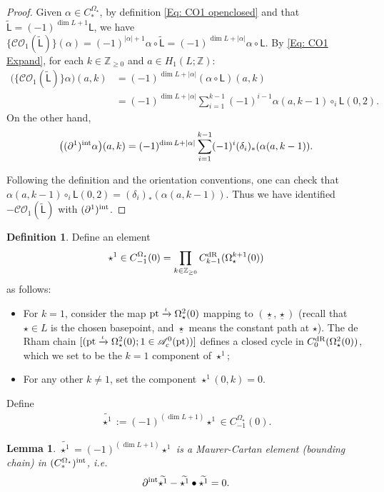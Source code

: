 \documentclass[10pt]{amsart}
\numberwithin{equation}{section}
\theoremstyle{plain}
\newtheorem{lemma}[theorem]{Lemma}
\theoremstyle{definition}
\newtheorem{definition}[theorem]{Definition}
\theoremstyle{remark}
\numberwithin{equation}{section}
\newcommand{\Z}{\mathbb{Z}}
\newcommand{\wt}[1]{\widetilde{#1}}
\newcommand{\dR}{\textup{dR}}
\newcommand{\pt}{\textup{pt}}
\newcommand{\CO}{\mathcal{CO}}
\newcommand{\CBa}{C_*^{\Omega_\star}}
\newcommand{\Cba}[1]{C_{#1}^{\Omega_\star}}
\newcommand{\LL}{\textsf{L}}
\begin{document}
{\begin{proof}
 Given $\alpha\in \CBa$, by definition \eqref{Eq: CO1 openclosed} and that $\wt{\LL} = (-1)^{\dim L + 1} \LL$,  we have $\big\{\CO_1(\wt{\LL})\big\}(\alpha) = (-1)^{|\alpha|+1}\alpha\circ \wt{\LL} = (-1)^{\dim L + |\alpha|} \alpha \circ \LL$. By \eqref{Eq: CO1 Expand}, for each $k\in \Z_{\geq 0}$ and $a\in H_1(L;\Z)$:
 \begin{align*}
 	\big(\big\{\CO_1(\wt{\LL})\big\}\alpha \big)(a,k) &= (-1)^{\dim L + |\alpha|}(\alpha\circ \LL)(a,k) \\&= (-1)^{\dim L + |\alpha|}\sum_{i=1}^{k-1} (-1)^{i-1}  \alpha (a,k-1)\circ_i \LL(0,2).
 \end{align*}
 On the other hand, 
 \begin{align*}
 	\big((\partial^1)^{\textup{int}}\alpha\big)(a,k)=(-1)^{\dim L +|\alpha|} \sum_{i=1}^{k-1} (-1)^{i}(\delta_i)_*(\alpha (a,k-1)).
 \end{align*}

Following the definition and the orientation conventions, one can check that $\alpha(a,k-1)\circ_i \LL(0,2) = (\delta_i)_*(\alpha(a,k-1)).$
Thus we have identified $-\CO_1(\wt{\LL})$ with $(\partial^1)^{\textup{int}}$.
\end{proof}

\begin{definition}
	Define an element \[ \star^1\in \Cba{-1}(0) = \prod_{k\in \Z_{\geq 0}} C^\dR_{k-1}(\Omega_\star^{k+1}(0))\] as follows: 
	\begin{itemize}
		\item For $k=1$, consider the map $\pt\xrightarrow{\iota} \Omega^2_\star(0)$ mapping to $(\underline{\star},\underline{\star})$ (recall that $\star \in L$ is the chosen basepoint, and $\underline{\star}$ means the constant path at $\star$). The de Rham chain $[(\pt\xrightarrow{\iota} \Omega^2_\star(0); 1\in \mathscr{A}^0_c(\pt))]$ defines a closed cycle in $C^\dR_{0}(\Omega^2_\star(0))$, which we set to be the $k=1$ component of $\star^1$;
		\item For any other $k\neq 1$, set the component $\star^1(0,k)=0$.
	\end{itemize}
	Define \begin{align}\label{Eq: BasedLoopMCApp} \wt{\star^1}:= (-1)^{(\dim L + 1)} \star^1 \in \Cba{-1}(0). \end{align}
\end{definition}

\begin{lemma}\label{Lm: OpenStrApp Step2}
	$\wt{\star^1}=(-1)^{(\dim L  +1)}\star^1$ is a Maurer-Cartan element (bounding chain) in $(\CBa)^{\textup{int}}$, i.e. 
	\begin{align*}
		\partial^{\textup{int}}\wt{\star^1} - \wt{\star^1} \bullet \wt{\star^1} = 0.
	\end{align*}
\end{lemma}

}
\end{document}
